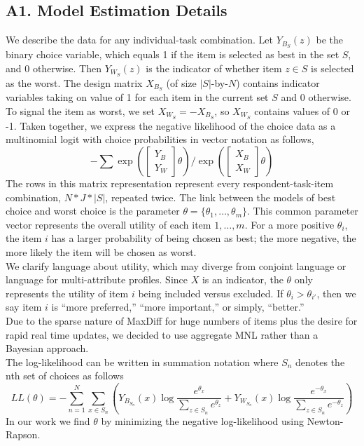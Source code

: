 \documentclass[a4paper,12pt]{article}
\begin{document}
\subsection*{A1. Model Estimation Details}
We describe the data for any individual-task combination. Let $Y_{B_S}(z)$ be the binary choice variable, which equals 1 if the item is selected as best in the set $S$, and 0 otherwise. Then $Y_{W_S}(z)$ is the indicator of whether item $z \in S$ is selected as the worst. The design matrix $X_{B_S}$ (of size $|S|$-by-$N$) contains indicator variables taking on value of 1 for each item in the current set $S$ and 0 otherwise. To signal the item as worst, we set $X_{W_S}=-X_{B_S}$, so $X_{W_S}$ contains values of 0 or -1.  Taken together, we express the negative likelihood of the choice data as a multinomial logit with choice probabilities in vector notation as follows,
\[
-\sum
\exp{(\begin{bmatrix}Y_B\\Y_W\end{bmatrix}\theta)} / \exp{(\begin{bmatrix}X_B\\X_W\end{bmatrix}\theta)}
\]
The rows in this matrix representation represent every respondent-task-item combination, $N*J*|S|$, repeated twice.  
The link between the models of best choice and worst choice is the parameter $\theta=\{\theta_1,\ldots,\theta_m \}$. This common parameter vector represents the overall utility of each item $1,\ldots,m$. For a more positive $\theta_i$, the item $i$ has a larger probability of being chosen as best; the more negative, the more likely the item will be chosen as worst.\\
We clarify language about utility, which may diverge from conjoint language or language for multi-attribute profiles. Since $X$ is an indicator, the $\theta$ only represents the utility of item $i$ being included versus excluded. If $\theta_i > \theta_{i'}$, then we say item $i$ is ``more preferred,'' ``more important,'' or simply, ``better.''\\
Due to the sparse nature of MaxDiff for huge numbers of items plus the desire for rapid real time updates, we decided to use aggregate MNL rather than a Bayesian approach.\\
The log-likelihood can be written in summation notation where $S_n$ denotes the nth set of choices as follows
\[
LL(\theta)=-\sum_{n=1}^N \sum_{x \in S_n} (Y_{B_{S_n}}(x)\log{\frac{e^{\theta_x}}{\sum_{z\in S_n} e^{\theta_z}}}+ Y_{W_{S_n}}(x)\log{\frac{e^{-\theta_x}}{\sum_{z\in S_n} e^{-\theta_z}}})
\]
In our work we find $\theta$ by minimizing the negative log-likelihood using Newton-Rapson.
\end{document}
